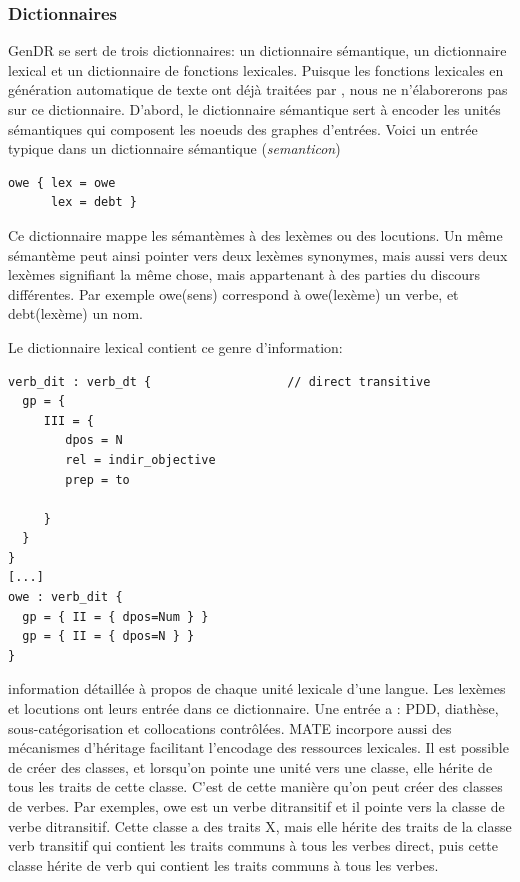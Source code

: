 \subsubsection{Dictionnaires}\label{dictio}
GenDR se sert de trois dictionnaires: un dictionnaire sémantique, un dictionnaire lexical et un dictionnaire de fonctions lexicales. Puisque les fonctions lexicales en génération automatique de texte ont déjà traitées par \cite{LambreyImplementationcollocationspour2017}, nous ne n'élaborerons pas sur ce dictionnaire. D'abord, le dictionnaire sémantique sert à encoder les unités sémantiques qui composent les noeuds des graphes d'entrées. Voici un entrée typique dans un dictionnaire sémantique (\emph{semanticon})

\begin{lstlisting}[language=Xml, caption = semanticon, label = semanticon]
owe { lex = owe
      lex = debt }
\end{lstlisting}
Ce dictionnaire mappe les sémantèmes à des lexèmes ou des locutions. Un même sémantème peut ainsi pointer vers deux lexèmes synonymes, mais aussi vers deux lexèmes signifiant la même chose, mais appartenant à des parties du discours différentes. Par exemple owe(sens) correspond à owe(lexème) un verbe, et debt(lexème) un nom.

Le dictionnaire lexical contient ce genre d'information:
\begin{lstlisting}[language=Xml, caption = lexicon]
verb_dit : verb_dt {                   // direct transitive
  gp = {
     III = {
        dpos = N
        rel = indir_objective
        prep = to  

     }
  }
}
[...]
owe : verb_dit {
  gp = { II = { dpos=Num } }
  gp = { II = { dpos=N } }
}
\end{lstlisting}
information détaillée à propos de chaque unité lexicale d'une langue. Les lexèmes et locutions ont leurs entrée dans ce dictionnaire. Une entrée a : PDD, diathèse, sous-catégorisation et collocations contrôlées. MATE incorpore aussi des mécanismes d'héritage facilitant l'encodage des ressources lexicales. Il est possible de créer des classes, et lorsqu'on pointe une unité vers une classe, elle hérite de tous les traits de cette classe. C'est de cette manière qu'on peut créer des classes de verbes. Par exemples, owe est un verbe ditransitif et il pointe vers la classe de verbe ditransitif. Cette classe a des traits X, mais elle hérite des traits de la classe verb transitif qui contient les traits communs à tous les verbes direct, puis cette classe hérite de verb qui contient les traits communs à tous les verbes. 

